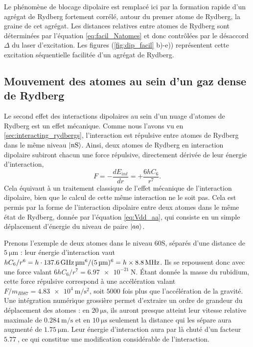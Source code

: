 Le phénomène de blocage dipolaire est remplacé ici par la formation rapide d'un \og agrégat de Rydberg \fg{} fortement corrélé, autour du premer atome de Rydberg, la \og graine \fg{} de cet agrégat.
Les distances relatives entre atomes de Rydberg sont déterminées par l'équation \eqref{eq:facil_Natomes} et donc contrôlées par le désaccord $\Delta$ du laser d'excitation.
Les figures (\ref{fig:dip_facil} b)-e)) représentent cette excitation séquentielle facilitée d'un agrégat de Rydberg.
%

	\subsection{Mouvement des atomes au sein d'un gaz dense de Rydberg}
	\noindent Le second effet des interactions dipolaires au sein d'un nuage d'atomes de Rydberg est un effet mécanique.
Comme nous l'avons vu en \ref{sec:interacting_rydbergs}, l'interaction est répulsive entre atomes de Rydberg dans le même niveau $\ket{\mathrm{nS}}$.
Ainsi, deux atomes de Rydberg en interaction dipolaire subiront chacun une force répulsive, directement dérivée de leur énergie d'interaction,
\begin{equation}
\label{eq:repuls_2atoms}
F = - \frac{d E_{int}}{dr}  = + \frac{6hC_6}{r^7}.
\end{equation}
Cela équivaut à un traitement classique de l'effet mécanique de l'interaction dipolaire, bien que le calcul de cette même interaction ne le soit pas.
Cela est permis par la forme de l'interaction dipolaire entre deux atomes dans le même état de Rydberg, donnée par l'équation \eqref{eq:Vdd_aa}, qui consiste en un simple déplacement d'énergie du niveau de paire $\ket{aa}$.

Prenons l'exemple de deux atomes dans le niveau $\mathrm{60S}$, séparés d'une distance de $\SI{5}{\um}$ : leur énergie d'interaction vaut $hC_6/r^6 = h\cdot {\SI{137.6}{\GHz\raiseto{6}\um}}/(\SI{5}{\um})^6 = h\times\SI{8.8}{\MHz}$.
Ils se repoussent donc avec une force valant %
$6hC_6/r^7 =\SI{6.97e-21}{\newton}$.
Étant donnée la masse du rubidium, cette force répulsive correspond à une accélération valant $F/m_{Rb87} = \SI{4.83e4}{\m\per\s\squared}$, soit $\num{5000}$ fois plus que l'accélération de la gravité.
Une intégration numérique grossière permet d'extraire un ordre de grandeur du déplacement des atomes : en $\SI{20}{\us}$, ils auront presque atteint leur vitesse relative maximale de $\SI{0.284}{\m\per\s}$ et en $\SI{10}{\us}$ seulement la distance qui les sépare aura augmenté de $\SI{1.75}{\um}$.
Leur énergie d'interaction aura par là chuté d'un facteur $\SI{5.77}{}$, ce qui constitue une modification considérable de l'interaction.

